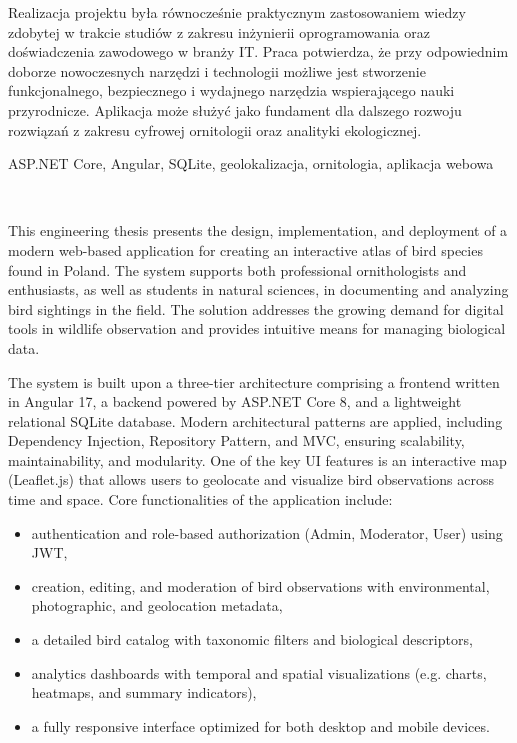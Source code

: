 Realizacja projektu była równocześnie praktycznym zastosowaniem wiedzy zdobytej w trakcie studiów z zakresu inżynierii oprogramowania oraz doświadczenia zawodowego w branży IT. Praca potwierdza, że przy odpowiednim doborze nowoczesnych narzędzi i technologii możliwe jest stworzenie funkcjonalnego, bezpiecznego i wydajnego narzędzia wspierającego nauki przyrodnicze. Aplikacja może służyć jako fundament dla dalszego rozwoju rozwiązań z zakresu cyfrowej ornitologii oraz analityki ekologicznej.


\vspace{10pt}
 ASP.NET Core, Angular, SQLite, geolokalizacja, ornitologia, aplikacja webowa

\vfill

\begin{center}
\\[1cm] 
\end{center}
This engineering thesis presents the design, implementation, and deployment of a modern web-based application for creating an interactive atlas of bird species found in Poland. The system supports both professional ornithologists and enthusiasts, as well as students in natural sciences, in documenting and analyzing bird sightings in the field. The solution addresses the growing demand for digital tools in wildlife observation and provides intuitive means for managing biological data.

The system is built upon a three-tier architecture comprising a frontend written in Angular 17, a backend powered by ASP.NET Core 8, and a lightweight relational SQLite database. Modern architectural patterns are applied, including Dependency Injection, Repository Pattern, and MVC, ensuring scalability, maintainability, and modularity. One of the key UI features is an interactive map (Leaflet.js) that allows users to geolocate and visualize bird observations across time and space.
Core functionalities of the application include:
\begin{itemize}
	\item authentication and role-based authorization (Admin, Moderator, User) using JWT,
	\item creation, editing, and moderation of bird observations with environmental, photographic, and geolocation metadata,
	\item a detailed bird catalog with taxonomic filters and biological descriptors,
	\item analytics dashboards with temporal and spatial visualizations (e.g. charts, heatmaps, and summary indicators),
	\item a fully responsive interface optimized for both desktop and mobile devices.
\end{itemize}

